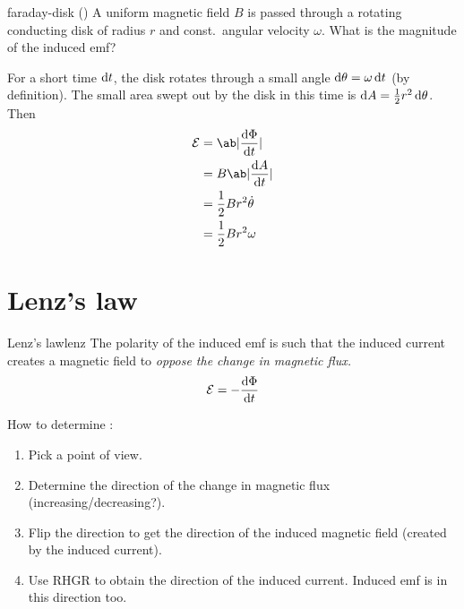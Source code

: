 \begin{example}{}{faraday-disk}
	() A uniform magnetic field \(B\) is passed
	through a rotating conducting disk of radius \(r\) and const.~angular velocity \(\omega\).
	What is the magnitude of the induced emf?

	For a short time \(\odif{t}\), the disk rotates through a small angle \(\odif{\theta} = \omega\odif{t}\) (by definition).
	The small area swept out by the disk in this time is \(\odif{A} = \f{1}{2}r^2\odif{\theta}\).
	Then
	\begin{align*}
		\mathcal{E} & = \ab|\odv{\Phi}{t}|       \\
		            & = B\ab|\odv{A}{t}|         \\
		            & = \f{1}{2}Br^2\dot{\theta} \\
		            & = \f{1}{2}Br^2\omega
	\end{align*}
\end{example}

\section{Lenz's law}
\begin{definition}{Lenz's law}{lenz}
	The polarity of the induced emf is such that the induced current
	creates a magnetic field to \it{oppose the change in magnetic flux}.
	\[\mathcal{E} = -\odv{\Phi}{t}\]
\end{definition}

How to determine :
\begin{enumerate}
	\item Pick a point of view.
	\item Determine the direction of the change in magnetic flux (increasing/decreasing?).
	\item Flip the direction to get the direction of the induced magnetic field (created by the induced current).
	\item Use RHGR to obtain the direction of the induced current. {\small Induced emf is in this direction too.}
\end{enumerate}

